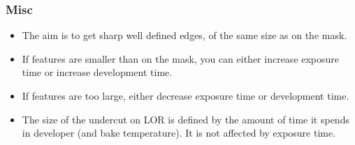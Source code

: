 \subsubsection{Misc}
\begin{itemize}
  \item The aim is to get sharp well defined edges, of the same size as on the mask.
  \item If features are smaller than on the mask, you can either increase exposure time or increase development time.
  \item If features are too large, either decrease exposure time or development time.
  \item The size of the undercut on LOR is defined by the amount of time it spends in developer (and bake temperature).
  It is not affected by exposure time.
\end{itemize}
\newpage

